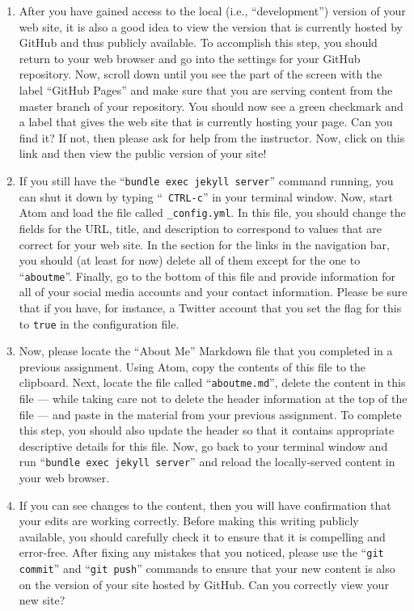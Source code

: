 \begin{enumerate}
  \item After you have gained access to the local (i.e., ``development'') version of your web site, it is also a good
    idea to view the version that is currently hosted by GitHub and thus publicly available. To accomplish this step,
    you should return to your web browser and go into the settings for your GitHub repository. Now, scroll down until
    you see the part of the screen with the label ``GitHub Pages'' and make sure that you are serving content from the
    master branch of your repository. You should now see a green checkmark and a label that gives the web site that is
    currently hosting your page. Can you find it? If not, then please ask for help from the instructor. Now,
    click on this link and then view the public version of your site!

  \item If you still have the ``{\tt bundle exec jekyll server}'' command running, you can shut it down by typing ``{\tt
    CTRL-c}'' in your terminal window. Now, start Atom and load the file called {\tt \_config.yml}. In this file, you
    should change the fields for the URL, title, and description to correspond to values that are correct for your web
    site. In the section for the links in the navigation bar, you should (at least for now) delete all of them except
    for the one to ``{\tt aboutme}''. Finally, go to the bottom of this file and provide information for all of your
    social media accounts and your contact information. Please be sure that if you have, for instance, a Twitter account
    that you set the flag for this to {\tt true} in the configuration file.

  \item Now, please locate the ``About Me'' Markdown file that you completed in a previous assignment. Using Atom, copy
    the contents of this file to the clipboard. Next, locate the file called ``{\tt aboutme.md}'', delete the content in
    this file --- while taking care not to delete the header information at the top of the file --- and paste in the
    material from your previous assignment. To complete this step, you should also update the header so that it contains
    appropriate descriptive details for this file. Now, go back to your terminal window and run ``{\tt bundle exec
    jekyll server}'' and reload the locally-served content in your web browser.

  \item If you can see changes to the content, then you will have confirmation that your edits are working correctly.
    Before making this writing publicly available, you should carefully check it to ensure that it is compelling and
    error-free. After fixing any mistakes that you noticed, please use the ``{\tt git commit}'' and ``{\tt git push}''
    commands to ensure that your new content is also on the version of your site hosted by GitHub. Can you correctly
    view your new site?


\end{enumerate}
